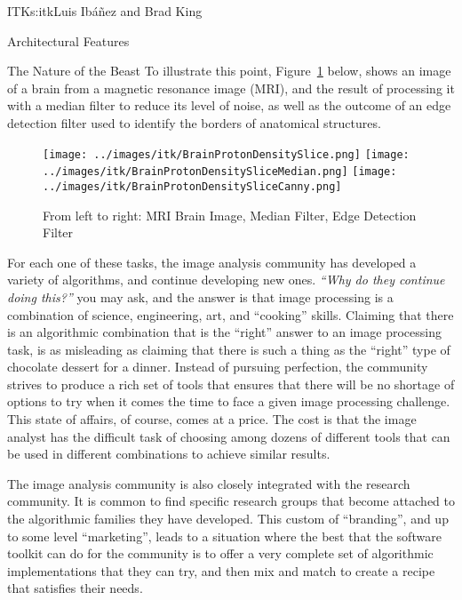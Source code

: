 \begin{aosachapter}{ITK}{s:itk}{Luis Ib\'{a}\~{n}ez and Brad King}
\begin{aosasect1}{Architectural Features}
\begin{aosasect2}{The Nature of the Beast}
To illustrate this point, Figure~\ref{fig.itk.brim} below, shows an image of a
brain from a magnetic resonance image (MRI), and the result of processing it
with a median filter to reduce its level of noise, as well as the outcome of an
edge detection filter used to identify the borders of anatomical structures.



%
%
%
\begin{figure}[h!]
\centering
\texttt{[image: ../images/itk/BrainProtonDensitySlice.png]}
\texttt{[image: ../images/itk/BrainProtonDensitySliceMedian.png]}
\texttt{[image: ../images/itk/BrainProtonDensitySliceCanny.png]}
\caption{From left to right: MRI Brain Image, Median Filter, Edge Detection Filter}
\label{fig.itk.brim}
\end{figure}

For each one of these tasks, the image analysis community has developed a
variety of algorithms, and continue developing new ones. \emph{``Why do they
continue doing this?''} you may ask, and the answer is that image processing is
a combination of science, engineering, art, and ``cooking'' skills. Claiming
that there is an algorithmic combination that is the ``right'' answer to an
image processing task, is as misleading as claiming that there is such a thing as
the ``right'' type of chocolate dessert for a dinner. Instead of pursuing
perfection, the community strives to produce a rich set of tools that
ensures that there will be no shortage of options to try when it comes the
time to face a given image processing challenge. This state of
affairs, of course, comes at a price. The cost is that the image
analyst has the difficult task of choosing among dozens of different
tools that can be used in different combinations to achieve similar
results.

The image analysis community is also closely integrated with the research
community. It is common to find specific research groups that become attached
to the algorithmic families they have developed. This custom of ``branding'',
and up to some level ``marketing'', leads to a situation where the best that the
software toolkit can do for the community is to offer a very complete set of
algorithmic implementations that they can try, and then mix and match to create
a recipe that satisfies their needs.


\end{aosasect2}
\end{aosasect1}
\end{aosachapter}
